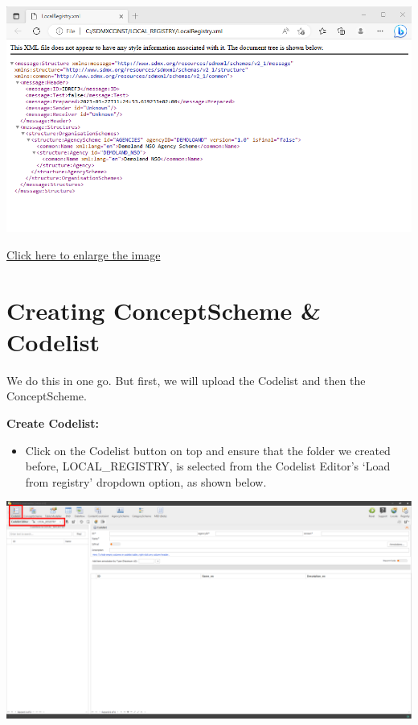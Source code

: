 \documentclass[
]{book}
\providecommand{\tightlist}{%
  \setlength{\itemsep}{0pt}\setlength{\parskip}{0pt}}
\theoremstyle{definition}
\theoremstyle{definition}
\theoremstyle{definition}
\theoremstyle{definition}
\theoremstyle{remark}
\begin{document}
\begin{center}\includegraphics[width=1\linewidth]{./images/image080} \end{center}

\href{images/image080.png}{Click here to enlarge the image}

\hypertarget{creating-conceptscheme}{%
\section{Creating ConceptScheme \& Codelist}\label{creating-conceptscheme}}

We do this in one go. But first, we will upload the Codelist and then the ConceptScheme.

\textbf{Create Codelist:}

\begin{itemize}
\tightlist
\item
  Click on the Codelist button on top and ensure that the folder we created before, LOCAL\_REGISTRY, is selected from the Codelist Editor's `Load from registry' dropdown option, as shown below.
\end{itemize}

\begin{center}\includegraphics[width=1\linewidth]{./images/image082} \end{center}
\end{document}
